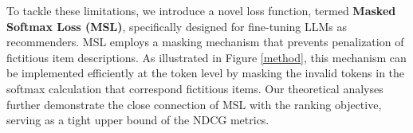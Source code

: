 \documentclass[sigconf,natbib=true]{acmart}
\begin{document}



To tackle these limitations, we introduce a novel loss function, termed \textbf{Masked Softmax Loss (MSL)}, specifically designed for fine-tuning LLMs as recommenders. MSL employs a masking mechanism that prevents penalization of fictitious item descriptions. As illustrated in Figure \ref{method}, this mechanism can be implemented efficiently at the token level by masking the invalid tokens in the softmax calculation that correspond fictitious items. Our theoretical analyses further demonstrate the close connection of MSL with the ranking objective, serving as a tight upper bound of the NDCG metrics. 
\end{document}
